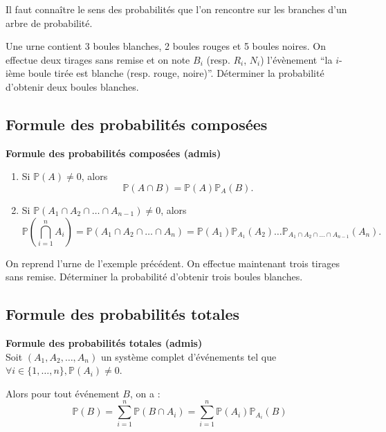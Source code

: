 \documentclass[../PolyS4.tex]{subfiles}
\begin{document}
\begin{Rmq} 
 Il faut connaître le sens des probabilités que l'on rencontre sur les branches d'un arbre de probabilité.\\
\end{Rmq} 


Une urne contient 3 boules blanches, 2 boules rouges et 5 boules noires. On effectue deux tirages sans remise et on note $B_i$ (resp. $R_i$, $N_i$) l'évènement ``la $i$-ième boule tirée est blanche (resp. rouge, noire)''. Déterminer la probabilité d'obtenir deux boules blanches.\\

\newpage

\subsection{Formule des probabilités composées}

\begin{Prop}\textbf{Formule des probabilités composées (admis)}\\

\begin{enumerate}
    \item Si $\mathbb{P}(A) \neq 0$, alors 
    \[
    \mathbb{P}(A \cap B) = \mathbb{P}(A)\mathbb{P}_A(B).
    \]
    \item Si $\mathbb{P}(A_1 \cap A_2 \cap \ldots \cap A_{n-1}) \neq 0$, alors 
    \[
    \mathbb{P}\left(\bigcap_{i=1}^n A_i\right) = \mathbb{P}(A_1 \cap A_2 \cap \ldots \cap A_n) = \mathbb{P}(A_1)\mathbb{P}_{A_1}(A_2) \ldots \mathbb{P}_{A_1 \cap A_2 \cap \ldots \cap A_{n-1}}(A_n).
    \]
\end{enumerate}
\end{Prop}


On reprend l'urne de l'exemple précédent. On effectue maintenant trois tirages sans remise. Déterminer la probabilité d'obtenir trois boules blanches.\\






\subsection{Formule des probabilités totales}
\begin{Prop}
\textbf{Formule des probabilités totales (admis)}\\

Soit $(A_1, A_2, \ldots, A_n)$ un système complet d'événements tel que $\forall i \in \{1, \ldots, n\}, \mathbb{P}(A_i) \neq 0$.

Alors pour tout événement $B$, on a :
\[
\mathbb{P}(B) = \sum_{i=1}^{n} \mathbb{P}(B \cap A_i) = \sum_{i=1}^{n} \mathbb{P}(A_i) \mathbb{P}_{A_i}(B)
\]
\end{Prop}
\end{document}
